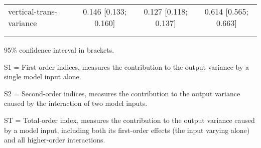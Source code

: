 \begin{table}[htp]
\begin{threeparttable}
\begin{tabular}{lccc}
	  \hspace{1.5em} vertical-trans-variance & 0.146 [0.133; 0.160]   & 0.127 [0.118; 0.137]   & 0.614 [0.565; 0.663] \\
	 \\
\addlinespace
\hline
\end{tabular}
\begin{tablenotes}
\scriptsize
\item 95\% confidence interval in brackets.
\item S1 = First-order indices,  measures the contribution to the output variance by a single model input alone.
\item S2 = Second-order indices,  measures the contribution to the output variance caused by the interaction of two model inputs.
\item ST = Total-order index, measures the contribution to the output variance caused by a model input, including both its first-order effects (the input varying alone) and all higher-order interactions.
\end{tablenotes}
\end{threeparttable}
\end{table}